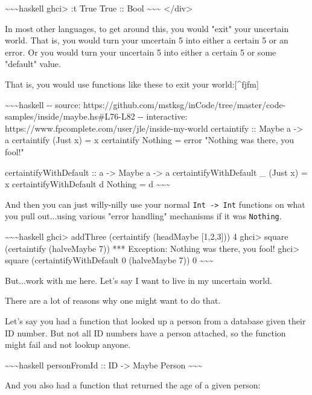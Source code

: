 \documentclass[]{article}
\begin{document}
\textasciitilde{}\textasciitilde{}\textasciitilde{}haskell ghci\textgreater{} :t
True True :: Bool \textasciitilde{}\textasciitilde{}\textasciitilde{}
\textless{}/div\textgreater{}

In most other languages, to get around this, you would "exit" your uncertain
world. That is, you would turn your uncertain 5 into either a certain 5 or an
error. Or you would turn your uncertain 5 into either a certain 5 or some
"default" value.

That is, you would use functions like these to exit your world:{[}\^{}fjfm{]}

\textasciitilde{}\textasciitilde{}\textasciitilde{}haskell -\/- source:
https://github.com/mstksg/inCode/tree/master/code-samples/inside/maybe.hs\#L76-L82
-\/- interactive: https://www.fpcomplete.com/user/jle/inside-my-world
certaintify :: Maybe a -\textgreater{} a certaintify (Just x) = x certaintify
Nothing = error "Nothing was there, you fool!"

certaintifyWithDefault :: a -\textgreater{} Maybe a -\textgreater{} a
certaintifyWithDefault \_ (Just x) = x certaintifyWithDefault d Nothing = d
\textasciitilde{}\textasciitilde{}\textasciitilde{}

And then you can just willy-nilly use your normal
\texttt{Int\ -\textgreater{}\ Int} functions on what you pull out...using
various "error handling" mechanisms if it was \texttt{Nothing}.

\textasciitilde{}\textasciitilde{}\textasciitilde{}haskell ghci\textgreater{}
addThree (certaintify (headMaybe {[}1,2,3{]})) 4 ghci\textgreater{} square
(certaintify (halveMaybe 7)) *** Exception: Nothing was there, you fool!
ghci\textgreater{} square (certaintifyWithDefault 0 (halveMaybe 7)) 0
\textasciitilde{}\textasciitilde{}\textasciitilde{}

But...work with me here. Let's say I want to live in my uncertain world.

There are a lot of reasons why one might want to do that.

Let's say you had a function that looked up a person from a database given their
ID number. But not all ID numbers have a person attached, so the function might
fail and not lookup anyone.

\textasciitilde{}\textasciitilde{}\textasciitilde{}haskell personFromId :: ID
-\textgreater{} Maybe Person \textasciitilde{}\textasciitilde{}\textasciitilde{}

And you also had a function that returned the age of a given person:
\end{document}
